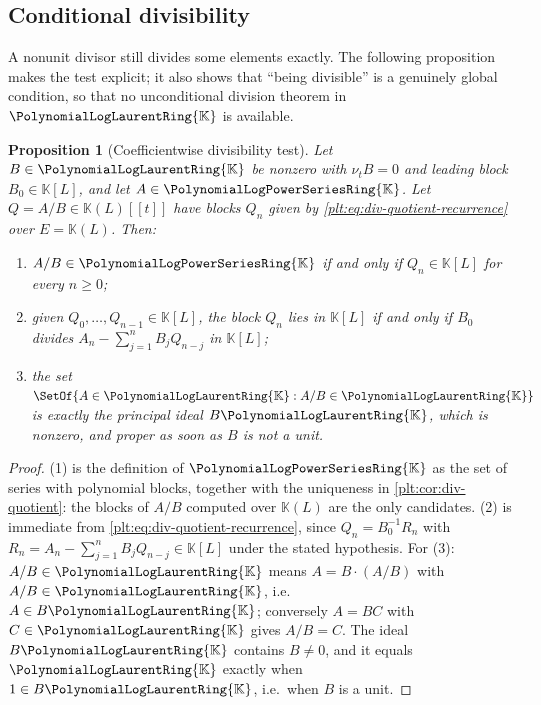 \documentclass[11pt,oneside]{article}
\theoremstyle{plain}
\newtheorem{proposition}[theorem]{Proposition}
\theoremstyle{definition}
\theoremstyle{remark}
\newcommand{\K}{\mathbb{K}}
\newcommand{\PLpow}{\PolynomialLogPowerSeriesRing{\K}}   %
\newcommand{\PLlau}{\PolynomialLogLaurentRing{\K}}       %
\newcommand{\ordt}{\nu_{t}}                              %
\begin{document}
\subsection{Conditional divisibility}
\label{plt:sec:div-conditional}

A nonunit divisor still divides some elements exactly.  The following
proposition makes the test explicit; it also shows that ``being divisible'' is
a genuinely global condition, so that no unconditional division theorem in
\(\PLlau\) is available.

\begin{proposition}[Coefficientwise divisibility test]
\label{plt:prop:div-conditional}
Let \(B\in\PLlau\) be nonzero with \(\ordt B=0\) and leading block \(B_{0}\in
\K[L]\), and let \(A\in\PLpow\).  Let \(Q=A/B\in\K(L)[[t]]\) have blocks
\(Q_{n}\) given by \cref{plt:eq:div-quotient-recurrence} over \(E=\K(L)\).
Then:
\begin{enumerate}
\item \(A/B\in\PLpow\) if and only if \(Q_{n}\in\K[L]\) for every \(n\ge0\);
\item given \(Q_{0},\dots,Q_{n-1}\in\K[L]\), the block \(Q_{n}\) lies in
      \(\K[L]\) if and only if \(B_{0}\) divides
      \(A_{n}-\sum_{j=1}^{n}B_{j}Q_{n-j}\) in \(\K[L]\);
\item the set \(\SetOf{A\in\PLlau:A/B\in\PLlau}\) is exactly the principal
      ideal \(B\PLlau\), which is nonzero, and proper as soon as \(B\) is not a
      unit.
\end{enumerate}
\end{proposition}

\begin{proof}
(1) is the definition of \(\PLpow\) as the set of series with polynomial
blocks, together with the uniqueness in \cref{plt:cor:div-quotient}: the blocks
of \(A/B\) computed over \(\K(L)\) are the only candidates.  (2) is immediate
from \cref{plt:eq:div-quotient-recurrence}, since \(Q_{n}=B_{0}^{-1}R_{n}\)
with \(R_{n}=A_{n}-\sum_{j=1}^{n}B_{j}Q_{n-j}\in\K[L]\) under the stated
hypothesis.  For (3): \(A/B\in\PLlau\) means \(A=B\cdot(A/B)\) with
\(A/B\in\PLlau\), i.e.\ \(A\in B\PLlau\); conversely \(A=BC\) with
\(C\in\PLlau\) gives \(A/B=C\).  The ideal \(B\PLlau\) contains \(B\ne0\), and
it equals \(\PLlau\) exactly when \(1\in B\PLlau\), i.e.\ when \(B\) is a unit.
\end{proof}
\end{document}
